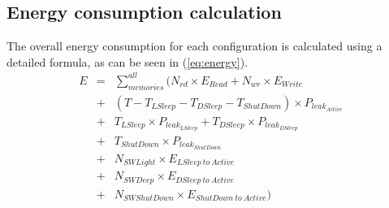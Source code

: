 \subsection{Energy consumption calculation}
The overall energy consumption for each configuration is calculated using a detailed formula, as can be seen in (\ref{eq:energy}). 
\begin{equation}
\label{eq:energy}
\begin{array}{lcl}
E&=&\sum\limits_{memories}^{all}  ( N_{rd} \times E_{Read}+ N_{wr} \times E_{Write}\\
&+&(T-T_{LSleep}-T_{DSleep}-T_{ShutDown})\times P_{leak_{Active}}\\
&+&T_{LSleep} \times P_{leak_{LSleep}}+T_{DSleep} \times P_{leak_{DSleep}}\\
&+&T_{ShutDown} \times P_{leak_{ShutDown}}\\
&+&N_{SWLight} \times E_{LSleep \: to \: Active}\\
&+&N_{SWDeep} \times E_{DSleep \: to \: Active}\\
&+&N_{SWShutDown} \times E_{ShutDown \: to \: Active} )\\
\end{array}
\end{equation}
					
